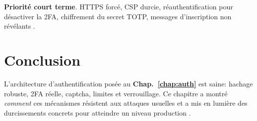 \vspace{0.5em}
\noindent \textbf{Priorité court terme}. HTTPS forcé, CSP durcie, réauthentification pour désactiver la 2FA, chiffrement du secret TOTP, messages d'inscription non \og révélants \fg{}.

\section{Conclusion}
\noindent L'architecture d'authentification posée au \textbf{Chap.~\ref{chap:auth}} est saine: hachage robuste, 2FA réelle, captcha, limites et verrouillage. Ce chapitre a montré \emph{comment} ces mécanismes résistent aux attaques usuelles et a mis en lumière des durcissements concrets pour atteindre un niveau \og production \fg{}.

